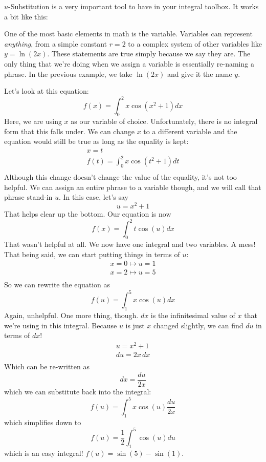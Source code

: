 \documentclass[../revisedmain.tex]{subfiles}
\begin{document}
	$u$-Substitution is a very important tool to have in your integral toolbox. It works a bit like this:
	\begin{displayquote}
		One of the most basic elements in math is the variable. Variables can represent \textit{anything}, from a simple constant $r=2$ to a complex system of other variables like $y=\ln(2x)$. These statements are true simply because we say they are. The only thing that we're doing when we assign a variable is essentially re-naming a phrase. In the previous example, we take $\ln(2x)$ and give it the name $y$.
	\end{displayquote}
	Let's look at this equation:\[f(x)=\int_{0}^{2}x\cos(x^2+1)dx\]Here, we are using $x$ as our variable of choice. Unfortunately, there is no integral form that this falls under. We can change $x$ to a different variable and the equation would still be true as long as the equality is kept:
	\begin{gather*}
		x=t\\f(t)=\int_{0}^{2}x\cos(t^2+1)dt\\
	\end{gather*}Although this change doesn't change the value of the equality, it's not too helpful. We can assign an entire phrase to a variable though, and we will call that phrase stand-in $u$. In this case, let's say\[u=x^2+1\] That helps clear up the bottom. Our equation is now\[f(x)=\int_{0}^{2}t\cos(u)dx\]That wasn't helpful at all. We now have one integral and two variables. A mess! That being said, we can start putting things in terms of $u$:
	\begin{gather*}
		x=0 \mapsto u=1\\
		x=2 \mapsto u=5\\
	\end{gather*}
	So we can rewrite the equation as \[f(u)=\int_{1}^{5}x\cos(u)dx\] Again, unhelpful. One more thing, though. $dx$ is the infinitesimal value of $x$ that we're using in this integral. Because $u$ is just $x$ changed slightly, we can find $du$ in terms of $dx$!
	\begin{gather*}
		u=x^2+1\\du=2x\, dx\\
	\end{gather*} Which can be re-written as \[dx=\frac{du}{2x}\] which we can substitute back into the integral: \[f(u)=\int_{1}^{5}x\cos(u)\frac{du}{2x}\] which simplifies down to \[f(u)=\frac{1}{2}\int_{1}^{5}\cos(u)du\] which is an easy integral! $f(u)=\sin(5)-\sin(1)$.\\
\end{document}
